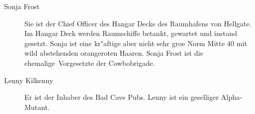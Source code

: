 
\begin{description}
    \item[Sonja Frost] Sie ist der Chief Officer des Hangar Decks des Raumhafens von Hellgate. Im Hangar Deck werden Raumschiffe    
        betankt, gewartet und instand gesetzt. Sonja ist eine kr"aftige aber nicht sehr gro\3e Norm Mitte 40 mit wild abstehenden orangeroten Haaren. Sonja Frost ist die ehemalige~Vorgesetzte der Cowbobrigade.
    \item[Lenny Kilkenny] Er ist der Inhaber des Bad Cave Pubs. Lenny ist ein geselliger Alpha-Mutant.
\end{description}
